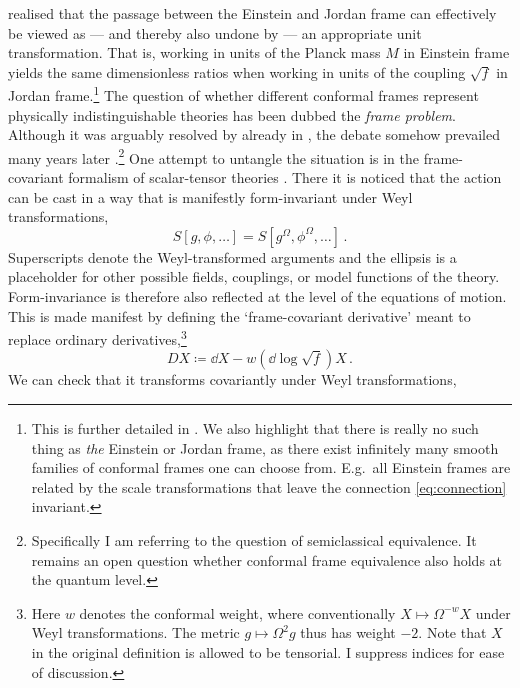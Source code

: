 \documentclass[12pt]{article}
\numberwithin{equation}{section}
\begin{document}
\citet{Dicke1962} realised that the passage between the Einstein and Jordan frame can effectively be viewed as --- and thereby also undone by --- an appropriate unit transformation. That is, working in units of the Planck mass $M$ in Einstein frame yields the same dimensionless ratios when working in units of the coupling $\sqrt{f}$ in Jordan frame.\footnote{This is further detailed in \citet{KaramitsosMuntz2025} \citep[see also][for a related discussion]{Bento2025}. We also highlight that there is really no such thing as \emph{the} Einstein or Jordan frame, as there exist infinitely many smooth families of conformal frames one can choose from. E.g.~all Einstein frames are related by the scale transformations that leave the connection \eqref{eq:connection} invariant.} The question of whether different conformal frames represent physically indistinguishable theories has been dubbed the \emph{frame problem}. Although it was arguably resolved by \citeauthor{Dicke1962} already in \citeyear{Dicke1962}, the debate somehow prevailed many years later \citep[see][Section~3]{FaraoniGunzigNardone1999}.\footnote{Specifically I am referring to the question of semiclassical equivalence. It remains an open question whether conformal frame equivalence also holds at the quantum level.} One attempt to untangle the situation is in the frame-covariant formalism of scalar-tensor theories \citep{Flanagan2004, KuuskJarvVilson2016, Karamitsos2018}. There it is noticed that the action can be cast in a way that is manifestly form-invariant under Weyl transformations,
\begin{equation}
    S[g,\phi,\dots] = S[g^\Omega,\phi^\Omega,\dots]\,.
\end{equation}
Superscripts denote the Weyl-transformed arguments and the ellipsis is a placeholder for other possible fields, couplings, or model functions of the theory. Form-invariance is therefore also reflected at the level of the equations of motion. This is made manifest by defining the `frame-covariant derivative' meant to replace ordinary derivatives,\footnote{Here $w$ denotes the conformal weight, where conventionally $X\mapsto \Omega^{-w}X$ under Weyl transformations. The metric $g\mapsto \Omega^2g$ thus has weight $-2$. Note that $X$ in the original definition is allowed to be tensorial. I suppress indices for ease of discussion.}
\begin{equation}
    D X \coloneqq \dd X - w(\dd \log\sqrt{f})X\,.
\end{equation}
We can check that it transforms covariantly under Weyl transformations,
\end{document}

